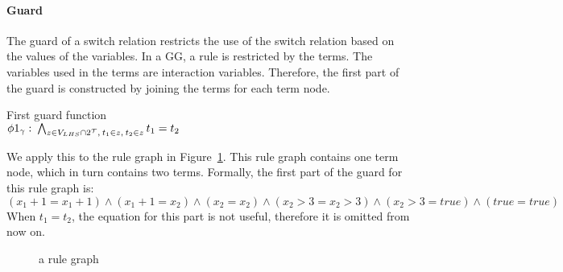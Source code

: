 \paragraph*{Guard}\label{sec:guards}
The guard of a switch relation restricts the use of the switch relation based on the values of the variables. In a GG, a rule is restricted by the terms. The variables used in the terms are interaction variables. Therefore, the first part of the guard is constructed by joining the terms for each term node.
\vspace{10px}\begin{definition} First guard function
\vspace{2px} \\
$\phi 1_{\gamma}:\: \bigwedge_{z \in V_{LHS} \cap 2^{\mathcal{T}},\: t_1 \in z,\: t_2 \in z}t_1 = t_2$
\end{definition}
\vspace{10px} 
We apply this to the rule graph in Figure~\ref{fig:guard_example}. This rule graph contains one term node, which in turn contains two terms. Formally, the first part of the guard for this rule graph is:
\vspace{5px} \\
$(x_1+1 = x_1+1) \land (x_1+1 = x_2) \land (x_2 = x_2) \land (x_2 > 3 = x_2 > 3) \land (x_2 > 3 = true) \land (true = true)$
\vspace{5px} \\
When $t_1 = t_2$, the equation for this part is not useful, therefore it is omitted from now on. 

\begin{figure}[h]
  \begin{center}
    
  \end{center}
  \caption{a rule graph}
  \label{fig:guard_example}
\end{figure}

